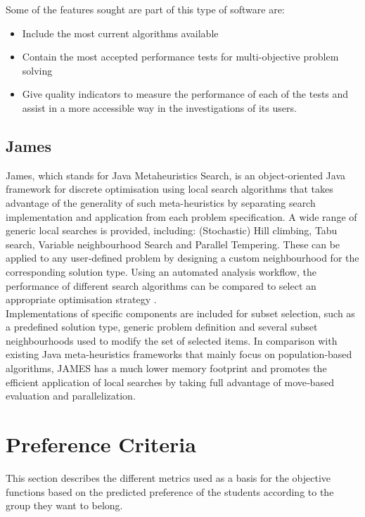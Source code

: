 Some of the features sought are part of this type of software are:

\begin{itemize}
    \item Include the most current algorithms available
    \item Contain the most accepted performance tests for multi-objective problem solving
    \item Give quality indicators to measure the performance of each of the tests and assist in a more accessible way in the investigations of its users.
\end{itemize}

\subsection{James}

 James, which stands for Java Metaheuristics Search, is an object‐oriented Java framework for discrete optimisation using local search algorithms that takes advantage of the generality of such meta-heuristics by separating search implementation and application from each problem specification. A wide range of generic local searches is provided, including:
 (Stochastic) Hill climbing, Tabu search, Variable neighbourhood Search and Parallel Tempering. These can be applied to any user‐defined problem by designing a custom neighbourhood for the corresponding solution type. Using an automated analysis workflow, the performance of different search algorithms can be compared to select an appropriate optimisation strategy \cite{de2017james}.\\
 
 Implementations of specific components are included for subset selection, such as a predefined solution type, generic problem definition and several subset neighbourhoods used to modify the set of selected items. In comparison with existing Java meta-heuristics frameworks that mainly focus on population‐based algorithms, JAMES has a much lower memory footprint and promotes the efficient application of local searches by taking full advantage of move‐based evaluation and parallelization.\\

\section{Preference Criteria}
\label{section:preference_criteria}

This section describes the different metrics used as a basis for the objective functions based on the predicted preference of the students according to the group they want to belong.

